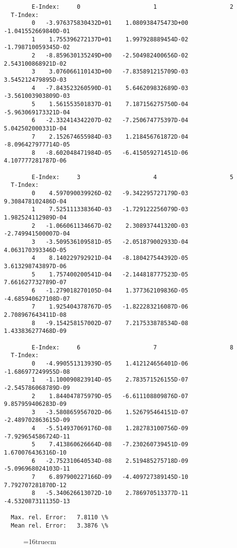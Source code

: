 \documentclass[12pt,dvipdfmx]{article}
\begin{document}
{\begin{small}
\begin{verbatim}
        E-Index:     0                     1                     2
  T-Index:
        0   -3.976375830432D+01    1.080938475473D+00   -1.041552669840D-01
        1    1.755396272137D+01    1.997928889454D-02   -1.798710059345D-02
        2   -8.859630135249D+00   -2.504982400656D-02    2.543100868921D-02
        3    3.076066110143D+00   -7.835891215709D-03    3.545212479895D-03
        4   -7.843523260590D-01    5.646209832689D-03   -3.561003903809D-03
        5    1.561553501837D-01    7.187156275750D-04   -5.963069173321D-04
        6   -2.332414342207D-02   -7.250674775397D-04    5.042502000331D-04
        7    2.152674655984D-03    1.218456761872D-04   -8.096427977714D-05
        8   -8.602048471984D-05   -6.415059271451D-06    4.107777281787D-06

        E-Index:     3                     4                     5
  T-Index:
        0    4.597090039926D-02   -9.342295727179D-03    9.308478102486D-04
        1    7.525111338364D-03   -1.729122256079D-03    1.982524112989D-04
        2   -1.066061134667D-02    2.308937441320D-03   -2.749941500007D-04
        3   -3.509536109581D-05   -2.051879002933D-04    4.063170393346D-05
        4    8.140229792921D-04   -8.180427544392D-05    3.613298743897D-06
        5    1.757400200541D-04   -2.144818777523D-05    7.661627732789D-07
        6   -1.279018270105D-04    1.377362109836D-05   -4.685940627108D-07
        7    1.925404378767D-05   -1.822283216087D-06    2.708967643411D-08
        8   -9.154258157002D-07    7.217533878534D-08    1.433836277468D-09

        E-Index:     6                     7                     8
  T-Index:
        0   -4.990551313939D-05    1.412124656401D-06   -1.686977249955D-08
        1   -1.100090823914D-05    2.783571526155D-07   -2.545786068789D-09
        2    1.844047875979D-05   -6.611108809876D-07    9.857959406283D-09
        3   -3.580865956702D-06    1.526795464151D-07   -2.489702863615D-09
        4   -5.514937069176D-08    1.282783100756D-09   -7.929654586724D-11
        5    7.413860626664D-08   -7.230260739451D-09    1.670076436316D-10
        6   -2.752310640534D-08    2.519485275718D-09   -5.096968024103D-11
        7    6.897900227166D-09   -4.409727389145D-10    7.792707281870D-12
        8   -5.340626613072D-10    2.786970513377D-11   -4.532087311135D-13

  Max. rel. Error:   7.8110 \%
  Mean rel. Error:   3.3876 \%

\end{verbatim}\end{small}
\begin{figure} \label{2.2.5e}
\epsfxsize=16truecm
\end{figure}

}
\end{document}
